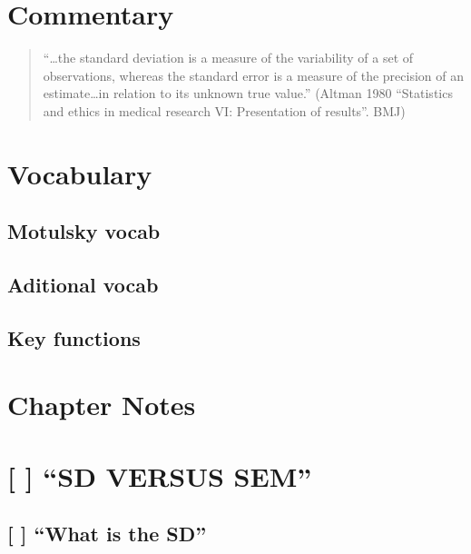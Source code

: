 \documentclass[]{book}
\theoremstyle{definition}
\theoremstyle{definition}
\theoremstyle{definition}
\theoremstyle{remark}
\begin{document}
\section*{Commentary}\label{commentary-12}

\begin{quote}
``\ldots{}the standard deviation is a measure of the variability of a
set of observations, whereas the standard error is a measure of the
precision of an estimate\ldots{}in relation to its unknown true value.''
(Altman 1980 ``Statistics and ethics in medical research VI:
Presentation of results''. BMJ)
\end{quote}

\section*{Vocabulary}\label{vocabulary-13}

\subsection*{Motulsky vocab}\label{motulsky-vocab-13}

\subsection*{Aditional vocab}\label{aditional-vocab-10}

\subsection*{Key functions}\label{key-functions-12}

\section*{Chapter Notes}\label{chapter-notes-13}

\section{\texorpdfstring{{[} {]} ``SD VERSUS
SEM''}{{[} {]} SD VERSUS SEM}}\label{sd-versus-sem}

\subsection{\texorpdfstring{{[} {]} ``What is the
SD''}{{[} {]} What is the SD}}\label{what-is-the-sd}
\end{document}
